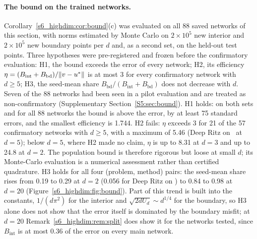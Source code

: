 \paragraph{The bound on the trained networks.} Corollary~\ref{s6_highdim:cor:bound}(c) was
evaluated on all 88 saved networks of this section, with norms estimated by Monte Carlo on
$2\times10^5$ new interior and $2\times10^5$ new boundary points per $d$ and, as a second set, on
the held-out test points. Three hypotheses were pre-registered and frozen before the
confirmatory evaluation: H1, the bound exceeds the error of every network; H2, its efficiency
$\eta=(B_{\mathrm{int}}+B_{\mathrm{bd}})/\lVert v-u^{*}\rVert$ is at most 3 for every confirmatory
network with $d\ge5$; H3, the seed-mean share $B_{\mathrm{bd}}/(B_{\mathrm{int}}+B_{\mathrm{bd}})$
does not decrease with $d$. Seven of the 88 networks had been seen in a pilot evaluation and are
treated as non-confirmatory (Supplementary Section~\ref{S5:sec:bound}).
H1 holds: on both sets and for all 88 networks the bound is above the error, by at least 75
standard errors, and the smallest efficiency is 1.744. H2 fails: $\eta$ exceeds 3 for 21 of the
57 confirmatory networks with $d\ge5$, with a maximum of 5.46 (Deep Ritz on \Ptwo\ at $d=5$);
below $d=5$, where H2 made no claim, $\eta$ is up to 8.31 at $d=3$ and up to 24.8 at $d=2$. The
population bound is therefore rigorous but loose at small $d$; its Monte-Carlo evaluation
is a numerical assessment rather than certified quadrature. H3 holds
for all four (problem, method) pairs: the seed-mean share rises from 0.19 to 0.29 at $d=2$
(0.056 for Deep Ritz on \Ptwo) to 0.84 to 0.98 at $d=20$ (Figure~\ref{s6_highdim:fig:bound}). Part
of this trend is built into the constants, $1/(d\pi^2)$ for the interior and
$\sqrt{2dU_d}\sim d^{1/4}$ for the boundary, so H3 alone does not show that the error itself is
dominated by the boundary misfit; at $d=20$ Remark~\ref{s6_highdim:rem:split} does show it for the
networks tested, since $B_{\mathrm{int}}$ is at most 0.36 of the error on every main network.
